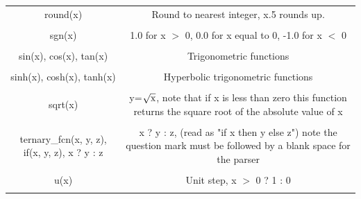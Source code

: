\begin{longtable}{c c}
round(x) & \begin{minipage}{20em}
Round to nearest integer, x.5 rounds up.
\end{minipage}\\ \\

sgn(x) & \begin{minipage}{20em}
1.0 for x $>$ 0, 0.0 for x equal to 0, -1.0 for x $<$ 0 
\end{minipage}\\ \\

sin(x), cos(x), tan(x) & \begin{minipage}{20em}
Trigonometric functions
\end{minipage}\\ \\

sinh(x), cosh(x), tanh(x) & \begin{minipage}{20em}
Hyperbolic trigonometric functions
\end{minipage}\\ \\

sqrt(x) & \begin{minipage}{20em}
y=$\sqrt{\rm{x}}$, note that if x is less than zero this function returns the square root of the absolute value of x
\end{minipage}\\ \\


ternary\_fcn(x, y, z), if(x, y, z), x ? y : z & \begin{minipage}{20em}
x ? y : z, (read as "if x then y else z") note the question mark must be followed by a blank space for the parser
\end{minipage}\\ \\

u(x) & \begin{minipage}{20em}
Unit step, x $>$ 0 ? 1 : 0
\end{minipage}\\ \\


\end{longtable}
